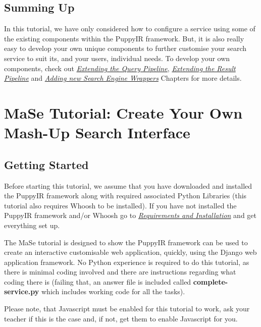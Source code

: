 \documentclass[letterpaper,10pt,english]{sphinxmanual}
\begin{document}
\subsection{Summing Up}
\label{ifse-tutorial:summing-up}
In this tutorial, we have only considered how to configure a service using some of the existing components within the PuppyIR framework. But, it is also really easy to develop your own unique components to further customise your search service to suit its, and your users, individual needs. To develop your own components, check out {\hyperref[extendingQuery:extending-the-query-pipeline]{\emph{Extending the Query Pipeline}}}, {\hyperref[extendingResult:extending-the-result-pipeline]{\emph{Extending the Result Pipeline}}} and {\hyperref[extendingSearchEngine:extending-the-search-engine]{\emph{Adding new Search Engine Wrappers}}} Chapters for more details.


\section{MaSe Tutorial: Create Your Own Mash-Up Search Interface}
\label{mase-tutorial:mase-mash-up-search-engine-puppyir-tutorial}\label{mase-tutorial::doc}\label{mase-tutorial:mase-tutorial-create-your-own-mash-up-search-interface}

\subsection{Getting Started}
\label{mase-tutorial:getting-started}
Before starting this tutorial, we assume that you have downloaded and installed the PuppyIR framework along with required associated Python Libraries (this tutorial also requires Whoosh to be installed). If you have not installed the PuppyIR framework and/or Whoosh go to {\hyperref[installation:requirements-and-installation]{\emph{Requirements and Installation}}} and get everything set up.

The MaSe tutorial is designed to show the PuppyIR framework can be used to create an interactive customisable web application, quickly, using the Django web application framework. No Python experience is required to do this tutorial, as there is minimal coding involved and there are instructions regarding what coding there is (failing that, an answer file is included called \textbf{complete-service.py} which includes working code for all the tasks).

Please note, that Javascript must be enabled for this tutorial to work, ask your teacher if this is the case and, if not, get them to enable Javascript for you.
\end{document}
